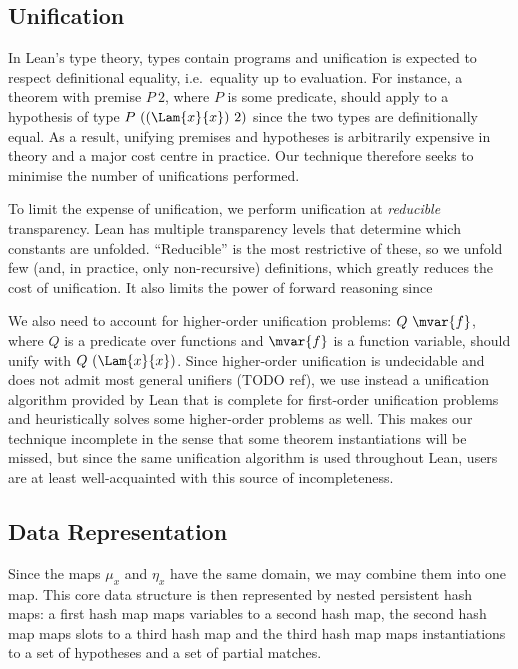 \documentclass[runningheads]{llncs}
\begin{document}
\subsection{Unification}

In Lean's type theory, types contain programs and unification is expected to respect definitional equality, i.e.\ equality up to evaluation.
For instance, a theorem with premise $P~2$, where $P$ is some predicate, should apply to a hypothesis of type $P~((\Lam{x}{x})~2)$ since the two types are definitionally equal.
As a result, unifying premises and hypotheses is arbitrarily expensive in theory and a major cost centre in practice.
Our technique therefore seeks to minimise the number of unifications performed.

To limit the expense of unification, we perform unification at \emph{reducible} transparency.
Lean has multiple transparency levels that determine which constants are unfolded.
\enquote{Reducible} is the most restrictive of these, so we unfold few (and, in practice, only non-recursive) definitions, which greatly reduces the cost of unification.
It also limits the power of forward reasoning since

We also need to account for higher-order unification problems: $Q~\mvar{f}$, where $Q$ is a predicate over functions and $\mvar{f}$ is a function variable, should unify with $Q~(\Lam{x}{x})$.
Since higher-order unification is undecidable and does not admit most general unifiers (TODO ref), we use instead a unification algorithm provided by Lean that is complete for first-order unification problems and heuristically solves some higher-order problems as well.
This makes our technique incomplete in the sense that some theorem instantiations will be missed, but since the same unification algorithm is used throughout Lean, users are at least well-acquainted with this source of incompleteness.

\subsection{Data Representation}

Since the maps $μ_{x}$  and $η_{x}$ have the same domain, we may combine them into one map.
This core data structure is then represented by nested persistent hash maps: a first hash map maps variables to a second hash map, the second hash map maps slots to a third hash map and the third hash map maps instantiations to a set of hypotheses and a set of partial matches.
\end{document}
